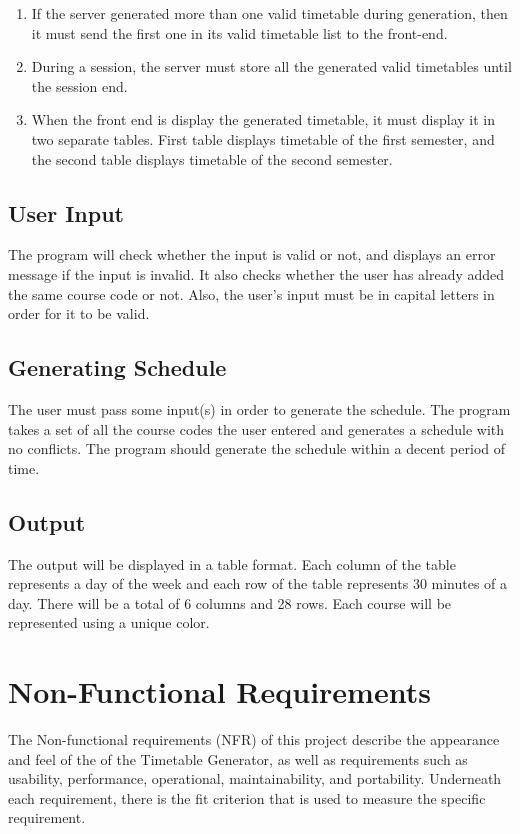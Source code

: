 \documentclass[12pt]{article}
\begin{document}
\begin{enumerate}
    \item If the server generated more than one valid timetable during generation, then it must send the first one in its valid timetable list to the front-end.
    \item During a session, the server must store all the generated valid timetables until the session end.
    \item When the front end is display the generated timetable, it must display it in two separate tables. First table displays timetable of the first semester, and the second table displays timetable of the second semester.
\end{enumerate}

\subsection{User Input}

\tab The program will check whether the input is valid or not, and displays an error message if the input is invalid. It also checks whether the user has already added the same course code or not. Also, the user's input must be in capital letters in order for it to be valid.
\
\subsection{Generating Schedule}
\tab The user must pass some input(s) in order to generate the schedule. The program takes a set of all the course codes the user entered and generates a schedule with no conflicts. The program should generate the schedule within a decent period of time. 

\subsection{Output}
\tab The output will be displayed in a table format. Each column of the table represents a day of the week and each row of the table represents 30 minutes of a day. There will be a total of 6 columns and 28 rows. Each course will be represented using a unique color.

\newpage
\section{Non-Functional Requirements}
\tab The Non-functional requirements (NFR) of this project describe the appearance and feel of the of the Timetable Generator, as well as requirements such as usability, performance, operational, maintainability, and portability. Underneath each requirement, there is the fit criterion that is used to measure the specific requirement.
\end{document}
